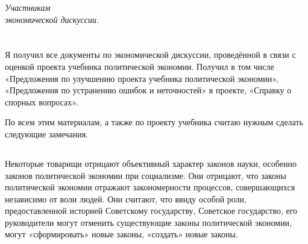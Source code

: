 \documentclass[12pt, a4paper, openany]{book}
\begin{document}
\newpage



\setcounter{secnumdepth}{0}






\begin{center}



\hangindent=10cm  \textit{Участникам \\ экономической дискуссии.}



\end{center}


\thispagestyle{empty} %


\vspace{0.8cm}

\section[ЗАМЕЧАНИЯ ПО ЭКОНОМИЧЕСКИМ ВОПРОСАМ, СВЯЗАННЫМ С НОЯБРЬСКОЙ ДИСКУССИЕЙ 1951 года]{}

Я получил все документы по экономической дискуссии, проведённой в связи с оценкой проекта учебника политической экономии. Получил в том числе «Предложения по улучшению проекта учебника политической экономии», «Предложения по устранению ошибок и неточностей» в проекте, «Справку о спорных вопросах».

По всем этим материалам, а также по проекту учебника считаю нужным сделать следующие замечания.

\vspace{0.4cm}

\subsection[1. Вопрос о характере экономических законов при социализме]{}

Некоторые товарищи отрицают объективный характер законов науки, особенно законов политической экономии при социализме. Они отрицают, что законы политической экономии отражают закономерности процессов, совершающихся независимо от воли людей. Они считают, что ввиду особой роли, предоставленной историей Советскому государству, Советское государство, его руководители могут отменить существующие законы политической экономии, могут «сформировать» новые законы, «создать» новые законы.
\end{document}
